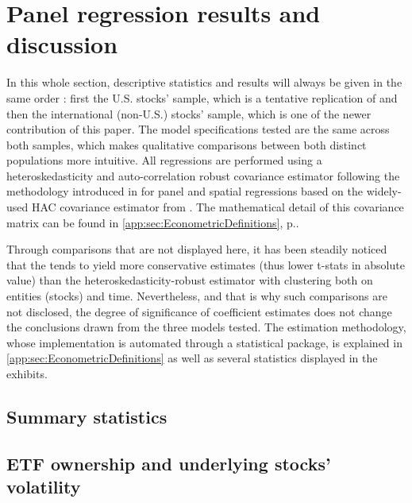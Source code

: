 \section{Panel regression results and discussion}
\label{sec:Results}
In this whole section, descriptive statistics and results will always be given in the same order : first the U.S. stocks' sample, which is a tentative replication of \textcite{Ben-David2018} and then the international (non-U.S.) stocks' sample, which is one of the newer contribution of this paper. The model specifications tested are the same across both samples, which makes qualitative comparisons between both distinct populations more intuitive. All regressions are performed using a heteroskedasticity and auto-correlation robust covariance estimator following the methodology introduced in \textcite{Driscoll1998} for panel and spatial regressions based on the widely-used HAC covariance estimator from \textcite{Newey1987}. The mathematical detail of this covariance matrix can be found in \autoref{app:sec:EconometricDefinitions}, p.\pageref{app:sec:EconometricDefinitions}.

Through comparisons that are not displayed here, it has been steadily noticed that the \textcite{Newey1987} tends to yield more conservative estimates (thus lower t-stats in absolute value) than the heteroskedasticity-robust estimator with clustering both on entities (stocks) and time. Nevertheless, and that is why such comparisons are not disclosed, the degree of significance of coefficient estimates does not change the conclusions drawn from the three models tested.  The estimation methodology, whose implementation is automated through a statistical package, is explained in \autoref{app:sec:EconometricDefinitions} as well as several statistics displayed in the exhibits.
\subsection{Summary statistics}

\subsection{ETF ownership and underlying stocks' volatility}
\label{sec:Results:sub:Volatility}
